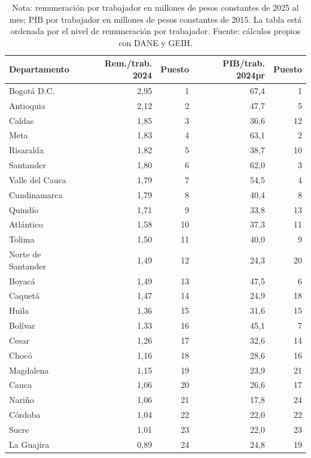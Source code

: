 \begin{table}[H]
\centering
\caption{Ranking departamental de niveles de remuneraci\'on por trabajador, 2024}
\label{tab:pib_geih_productividad_departamento_remuneracion_niveles}
\scriptsize
\begin{tabular}{lrrrr}
\toprule
Departamento & Rem./trab. 2024 & Puesto & PIB/trab. 2024pr & Puesto \\
\midrule
Bogotá D.C. & 2,95 & 1 & 67,4 & 1 \\
Antioquia & 2,12 & 2 & 47,7 & 5 \\
Caldas & 1,85 & 3 & 36,6 & 12 \\
Meta & 1,83 & 4 & 63,1 & 2 \\
Risaralda & 1,82 & 5 & 38,7 & 10 \\
Santander & 1,80 & 6 & 62,0 & 3 \\
Valle del Cauca & 1,79 & 7 & 54,5 & 4 \\
Cundinamarca & 1,79 & 8 & 40,4 & 8 \\
Quindío & 1,71 & 9 & 33,8 & 13 \\
Atlántico & 1,58 & 10 & 37,3 & 11 \\
Tolima & 1,50 & 11 & 40,0 & 9 \\
Norte de Santander & 1,49 & 12 & 24,3 & 20 \\
Boyacá & 1,49 & 13 & 47,5 & 6 \\
Caquetá & 1,47 & 14 & 24,9 & 18 \\
Huila & 1,36 & 15 & 31,6 & 15 \\
Bolívar & 1,33 & 16 & 45,1 & 7 \\
Cesar & 1,26 & 17 & 32,6 & 14 \\
Chocó & 1,16 & 18 & 28,6 & 16 \\
Magdalena & 1,15 & 19 & 23,9 & 21 \\
Cauca & 1,06 & 20 & 26,6 & 17 \\
Nariño & 1,06 & 21 & 17,8 & 24 \\
Córdoba & 1,04 & 22 & 22,0 & 22 \\
Sucre & 1,01 & 23 & 22,0 & 23 \\
La Guajira & 0,89 & 24 & 24,8 & 19 \\
\bottomrule
\end{tabular}
\caption*{\footnotesize Nota: remuneraci\'on por trabajador en millones de pesos constantes de 2025 al mes; PIB por trabajador en millones de pesos constantes de 2015. La tabla est\'a ordenada por el nivel de remuneraci\'on por trabajador. Fuente: c\'alculos propios con DANE y GEIH.}
\end{table}